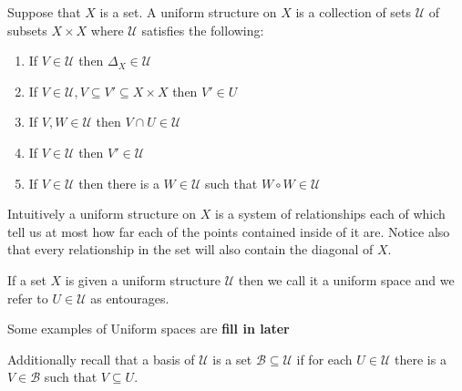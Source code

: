 \begin{defn}
  Suppose that $X$ is a set. A uniform structure on  $X$ is a collection of
  sets $\mathcal{U}$ of subsets $X \times X$ where $\mathcal{U}$ satisfies the
  following:
  \begin{enumerate}
    \item If $V \in \mathcal{U}$ then $\Delta_{X} \in \mathcal{U}$
    \item If $V \in \mathcal{U}, V \subseteq V' \subseteq X \times X$ then $V'
      \in U$
    \item If $V, W \in \mathcal{U}$ then $V \cap U \in \mathcal{U}$
    \item If $V \in \mathcal{U}$ then $V' \in \mathcal{U}$
    \item If $V \in \mathcal{U}$ then there is a $W \in \mathcal{U}$ such that
      $W \circ W \in \mathcal{U}$
  \end{enumerate}
\end{defn}
Intuitively a uniform structure on $X$ is a system of relationships each of
which tell us at most how far each of the points contained inside of it are.
Notice also that every relationship in the set will also contain the diagonal
of $X$.

If a set $X$ is given a uniform structure $\mathcal{U}$ then we call it
a uniform space and we refer to $U \in \mathcal{U}$ as entourages.

\begin{ex}
  Some examples of Uniform spaces are \textbf{fill in later}
\end{ex}

Additionally recall that a basis of $\mathcal{U}$ is a set $\mathcal{B}
\subseteq \mathcal{U}$ if for each $U \in \mathcal{U}$ there is a $V \in
\mathcal{B}$ such that $V \subseteq U$.

